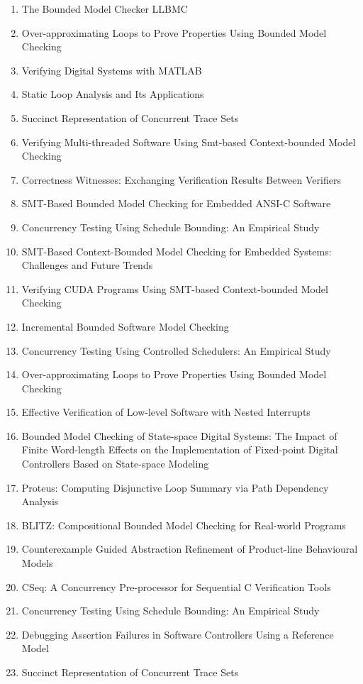 \begin{enumerate}
\item The Bounded Model Checker LLBMC
\item Over-approximating Loops to Prove Properties Using Bounded Model Checking
\item Verifying Digital Systems with MATLAB
\item Static Loop Analysis and Its Applications
\item Succinct Representation of Concurrent Trace Sets
\item Verifying Multi-threaded Software Using Smt-based Context-bounded Model Checking
\item Correctness Witnesses: Exchanging Verification Results Between Verifiers
\item SMT-Based Bounded Model Checking for Embedded ANSI-C Software
\item Concurrency Testing Using Schedule Bounding: An Empirical Study
\item SMT-Based Context-Bounded Model Checking for Embedded Systems: Challenges and Future Trends
\item Verifying CUDA Programs Using SMT-based Context-bounded Model Checking
\item Incremental Bounded Software Model Checking
\item Concurrency Testing Using Controlled Schedulers: An Empirical Study
\item Over-approximating Loops to Prove Properties Using Bounded Model Checking
\item Effective Verification of Low-level Software with Nested Interrupts
\item Bounded Model Checking of State-space Digital Systems: The Impact of Finite Word-length Effects on the Implementation of Fixed-point Digital Controllers Based on State-space Modeling
\item Proteus: Computing Disjunctive Loop Summary via Path Dependency Analysis
\item BLITZ: Compositional Bounded Model Checking for Real-world Programs
\item Counterexample Guided Abstraction Refinement of Product-line Behavioural Models
\item CSeq: A Concurrency Pre-processor for Sequential C Verification Tools
\item Concurrency Testing Using Schedule Bounding: An Empirical Study
\item Debugging Assertion Failures in Software Controllers Using a Reference Model
\item Succinct Representation of Concurrent Trace Sets
\end{enumerate}

